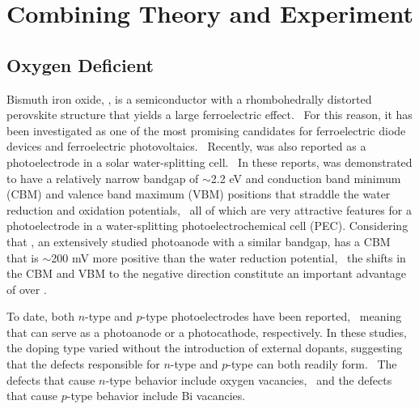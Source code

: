 
\section{Combining Theory and Experiment}

\subsection{Oxygen Deficient }

Bismuth iron oxide, , is a semiconductor with a rhombohedrally distorted perovskite structure that yields a large ferroelectric effect.~\cite{choi2009switchable} For this reason, it has been investigated as one of the most promising candidates for ferroelectric diode devices and ferroelectric photovoltaics.~\cite{choi2009switchable,yi2011mechanism,you2018enhancing,spanier2016power} Recently,  was also reported as a photoelectrode in a solar water-splitting cell.~\cite{shen2017dual,yilmaz2016perovskite,moniz2015visible,song2018domain,liu2016enhanced} In these reports,  was demonstrated to have a relatively narrow bandgap of $\sim$2.2 eV and conduction band minimum (CBM) and valence band maximum (VBM) positions that straddle the water reduction and oxidation potentials,~\cite{shen2017dual,yilmaz2016perovskite} all of which are very attractive features for a photoelectrode in a water-splitting photoelectrochemical cell (PEC). Considering that , an extensively studied photoanode with a similar bandgap, has a CBM that is $\sim$200 mV more positive than the water reduction potential,~\cite{sivula2016semiconducting} the shifts in the CBM and VBM to the negative direction constitute an important advantage of  over .~\cite{lee2019progress}

To date, both $n$-type and $p$-type  photoelectrodes have been reported,~\cite{shen2017dual,yilmaz2016perovskite,moniz2015visible,song2018domain,liu2016enhanced} meaning that  can serve as a photoanode or a photocathode, respectively. In these studies, the doping type varied without the introduction of external dopants, suggesting that the defects responsible for $n$-type and $p$-type  can both readily form.~\cite{lee2019progress} The defects that cause $n$-type behavior include oxygen vacancies,~\cite{paudel2012intrinsic} and the defects that cause $p$-type behavior include Bi vacancies.~\cite{rojac2017domain}

